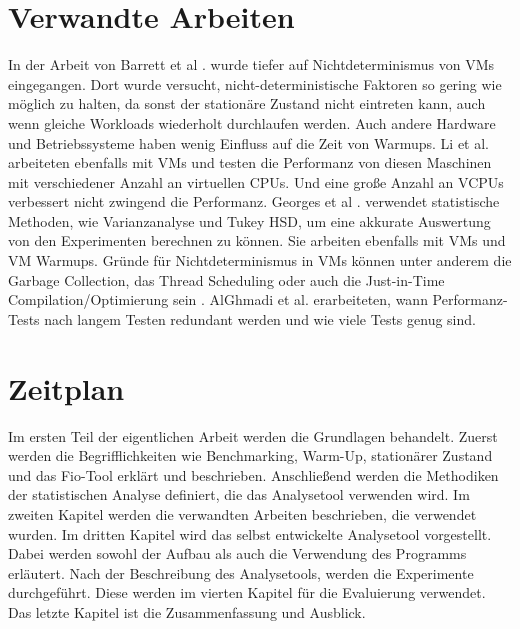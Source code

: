\documentclass{article}
\begin{document}
\section{Verwandte Arbeiten}
In der Arbeit von Barrett et al \cite{vmsHotandCold}. wurde tiefer auf Nichtdeterminismus von VMs eingegangen.
Dort wurde versucht, nicht-deterministische Faktoren so gering wie möglich zu halten, da sonst der stationäre Zustand nicht eintreten kann, auch wenn gleiche Workloads wiederholt durchlaufen werden. Auch  andere Hardware und Betriebssysteme haben wenig Einfluss auf die Zeit von Warmups. Li et al. \cite{9256518} arbeiteten ebenfalls mit VMs und testen die Performanz von diesen Maschinen mit verschiedener Anzahl an virtuellen CPUs. Und eine große Anzahl an VCPUs verbessert nicht zwingend die Performanz.
Georges et al \cite{10.1145/1297027.1297033}. verwendet statistische Methoden, wie Varianzanalyse und Tukey HSD, um eine akkurate Auswertung von den Experimenten berechnen zu können. 
\newpage
Sie arbeiten ebenfalls mit VMs und VM Warmups.
Gründe für Nichtdeterminismus in VMs können unter anderem die Garbage Collection, das Thread Scheduling oder auch die Just-in-Time Compilation/Optimierung sein \cite{stasticsInPerformance}.
AlGhmadi et al. erarbeiteten, wann Performanz-Tests nach langem Testen redundant werden und wie viele Tests genug sind.

\section{Zeitplan}
Im ersten Teil der eigentlichen Arbeit werden die Grundlagen behandelt.
Zuerst werden die Begrifflichkeiten wie Benchmarking, Warm-Up,
stationärer Zustand und das Fio-Tool erklärt und beschrieben. Anschließend werden die Methodiken
der statistischen Analyse definiert, die das  Analysetool verwenden wird.
Im zweiten Kapitel werden die verwandten Arbeiten beschrieben, die verwendet wurden. Im dritten Kapitel wird das selbst entwickelte Analysetool vorgestellt. Dabei werden sowohl der Aufbau als auch die Verwendung des Programms erläutert.
Nach der Beschreibung des Analysetools, werden die
Experimente durchgeführt. Diese werden im vierten Kapitel für die Evaluierung
verwendet. Das letzte Kapitel ist die Zusammenfassung und Ausblick.
\newpage
{}

\end{document}
